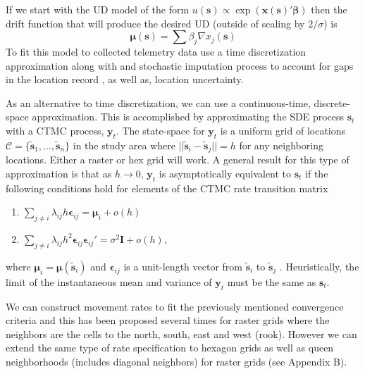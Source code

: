 \documentclass[12pt]{article}
\newcommand{\by}{\ensuremath{\mathbf{y}}}
\newcommand{\bx}{\ensuremath{\mathbf{x}}}
\newcommand{\bs}{\ensuremath{\mathbf{s}}}
\newcommand{\bb}{\ensuremath{\boldsymbol{\beta}}}
\newcommand{\be}{\ensuremath{\boldsymbol{\epsilon}}}
\newcommand{\bmu}{\ensuremath{\boldsymbol{\mu}}}
\newcommand{\fC}{\ensuremath{\mathcal{C}}}
\begin{document}
If we start with the UD model of the form $u(\bs) \propto \exp(\bx(\bs)'\bb)$ then the drift function that will produce the desired UD (outside of scaling by $2/\sigma$) is 
\[
\bmu(\bs) = \sum \beta_j \nabla x_j(\bs)
\]
To fit this model to collected telemetry data \citep{michelot2018langevin} use a time discretization approximation along with and stochastic imputation process \citep{xxx} to account for gaps in the location record , as well as, location uncertainty. 

As an alternative to time discretization, we can use a continuous-time, discrete-space approximation. This is accomplished by approximating the SDE process $\bs_t$ with a CTMC process, $\by_t$. The state-space for $\by_t$ is a uniform grid of locations $\fC = \{\tilde{\bs}_1,\dots,\tilde{\bs}_n\}$ in the study area where $||\tilde{\bs}_i-\tilde{\bs}_j|| = h$ for any neighboring locations. Either a raster or hex grid will work. A general result for this type of approximation is that as $h \to 0$, $\by_t$ is asymptotically equivalent to $\bs_t$ if the following conditions hold for elements of the CTMC rate transition matrix
\begin{enumerate}
\item $\sum_{j\ne i} \lambda_{ij} h \be_{ij} = \bmu_i + o(h)$
\item $\sum_{j\ne i} \lambda_{ij} h^2 \be_{ij}\be_{ij}' = \sigma^2\mathbf{I} + o(h)$,
\end{enumerate}
where $\bmu_i = \bmu(\tilde{\bs}_i)$ and $\be_{ij}$ is a unit-length vector from $\tilde{\bs}_i$ to $\tilde{\bs}_j$ \citep{xxx}. Heuristically, the limit of the instantaneous mean and variance of $\by_t$ must be the same as $\bs_t$. 

We can construct movement rates to fit the previously mentioned convergence criteria and this has been proposed several times for raster grids where the neighbors are the cells to the north, south, east and west (rook). However we can extend the same type of rate specification to hexagon grids as well as queen neighborhoods (includes diagonal neighbors) for raster grids (see Appendix B). 
\end{document}
